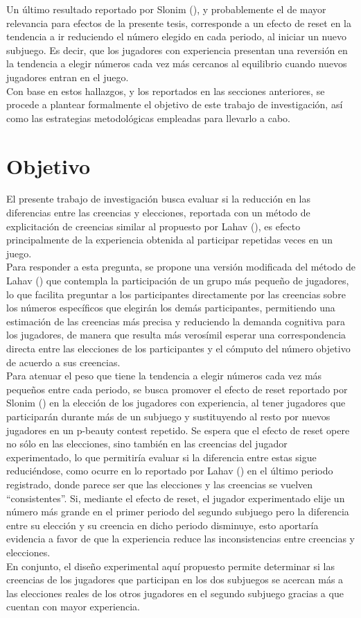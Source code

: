 Un último resultado reportado por Slonim (\citeyear{Slonim}), y probablemente el de mayor relevancia para efectos de la presente tesis, corresponde a un efecto de reset en la tendencia a ir reduciendo el número elegido en cada periodo, al iniciar un nuevo subjuego. Es decir, que los jugadores con experiencia presentan una reversión en la tendencia a elegir números cada vez más cercanos al equilibrio cuando nuevos jugadores entran en el juego.\\

Con base en estos hallazgos, y los reportados en las secciones anteriores, se procede a plantear formalmente el objetivo de este trabajo de investigación, así como las estrategias metodológicas empleadas para llevarlo a cabo. \\

\section{Objetivo}

El presente trabajo de investigación busca evaluar si la reducción en las diferencias entre las creencias y elecciones, reportada con un método de explicitación de creencias similar al propuesto por Lahav (\citeyear{Lahav}), es efecto principalmente de la experiencia obtenida al participar repetidas veces en un juego.\\

Para responder a esta pregunta, se propone una versión modificada del método de Lahav (\citeyear{Lahav}) que contempla la participación de un grupo más pequeño de jugadores, lo que facilita preguntar a los participantes directamente por las creencias sobre los números específicos que elegirán los demás participantes, permitiendo una estimación de las creencias más precisa y reduciendo la demanda cognitiva para los jugadores, de manera que resulta más verosímil esperar una correspondencia directa entre las elecciones de los participantes y el cómputo del número objetivo de acuerdo a sus creencias.\\

Para atenuar el peso que tiene la tendencia a elegir números cada vez más pequeños entre cada periodo, se busca promover el efecto de reset reportado por Slonim (\citeyear{Slonim}) en la elección de los jugadores con experiencia, al tener jugadores que participarán durante más de un subjuego y sustituyendo al resto por nuevos jugadores en un p-beauty contest repetido. Se espera que el efecto de reset opere no sólo en las elecciones, sino también en las creencias del jugador experimentado, lo que permitiría evaluar si la diferencia entre estas sigue reduciéndose, como ocurre en lo reportado por Lahav (\citeyear{Lahav}) en el último periodo registrado, donde parece ser que las elecciones y las creencias se vuelven “consistentes”. Si, mediante el efecto de reset, el jugador experimentado elije un número más grande en el primer periodo del segundo subjuego pero la diferencia entre su elección y su creencia en dicho periodo disminuye, esto aportaría evidencia a favor de que la experiencia reduce las inconsistencias entre creencias y elecciones.\\

En conjunto, el diseño experimental aquí propuesto permite determinar si las creencias de los jugadores que participan en los dos subjuegos se acercan más a las elecciones reales de los otros jugadores en el segundo subjuego gracias a que cuentan con mayor experiencia.\\

